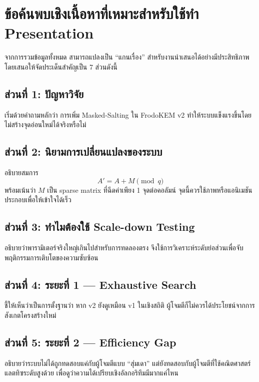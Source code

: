 \documentclass[12pt,a4paper]{article}
\newcommand{\eng}[1]{\textenglish{#1}}
\begin{document}
	\section{ข้อค้นพบเชิงเนื้อหาที่เหมาะสำหรับใช้ทำ Presentation}
	
	จากการรวมข้อมูลทั้งหมด สามารถแปลงเป็น ``แกนเรื่อง'' สำหรับงานนำเสนอได้อย่างมีประสิทธิภาพ โดยเสนอให้จัดประเด็นสำคัญเป็น 7 ส่วนดังนี้
	
	\subsection{ส่วนที่ 1: ปัญหาวิจัย}
	
	เริ่มด้วยคำถามหลักว่า การเพิ่ม \eng{Masked-Salting} ใน \eng{FrodoKEM v2} ทำให้ระบบแข็งแรงขึ้นโดยไม่สร้างจุดอ่อนใหม่ได้จริงหรือไม่
	
	\subsection{ส่วนที่ 2: นิยามการเปลี่ยนแปลงของระบบ}
	
	อธิบายสมการ
	\[
	A' = A + M \pmod q
	\]
	พร้อมเน้นว่า $M$ เป็น \eng{sparse matrix} ที่ฉีดค่าเพียง 1 จุดต่อคอลัมน์ จุดนี้ควรใช้ภาพหรือแอนิเมชันประกอบเพื่อให้เข้าใจได้เร็ว
	
	\subsection{ส่วนที่ 3: ทำไมต้องใช้ Scale-down Testing}
	
	อธิบายว่าพารามิเตอร์จริงใหญ่เกินไปสำหรับการทดลองตรง จึงใช้การวิเคราะห์ระดับย่อส่วนเพื่อจับพฤติกรรมการเติบโตของความซับซ้อน
	
	\subsection{ส่วนที่ 4: ระยะที่ 1 --- Exhaustive Search}
	
	ชี้ให้เห็นว่าเป็นการตั้งฐานว่า หาก \eng{v2} ยังดูเหมือน \eng{v1} ในเชิงสถิติ ผู้โจมตีก็ไม่ควรได้ประโยชน์จากการสังเกตโครงสร้างใหม่
	
	\subsection{ส่วนที่ 5: ระยะที่ 2 --- Efficiency Gap}
	
	อธิบายว่าระบบไม่ได้ถูกทดสอบแค่กับผู้โจมตีแบบ ``สุ่มเดา'' แต่ยังทดสอบกับผู้โจมตีที่ใช้คณิตศาสตร์แลตทิซระดับสูงด้วย เพื่อดูว่าความได้เปรียบเชิงอัลกอริทึมมีมากแค่ไหน
	
\end{document}
